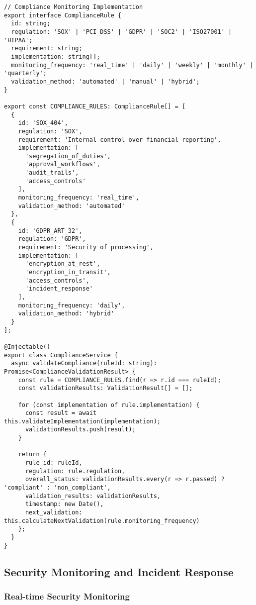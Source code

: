 \begin{verbatim}
// Compliance Monitoring Implementation
export interface ComplianceRule {
  id: string;
  regulation: 'SOX' | 'PCI_DSS' | 'GDPR' | 'SOC2' | 'ISO27001' | 'HIPAA';
  requirement: string;
  implementation: string[];
  monitoring_frequency: 'real_time' | 'daily' | 'weekly' | 'monthly' | 'quarterly';
  validation_method: 'automated' | 'manual' | 'hybrid';
}

export const COMPLIANCE_RULES: ComplianceRule[] = [
  {
    id: 'SOX_404',
    regulation: 'SOX',
    requirement: 'Internal control over financial reporting',
    implementation: [
      'segregation_of_duties',
      'approval_workflows',
      'audit_trails',
      'access_controls'
    ],
    monitoring_frequency: 'real_time',
    validation_method: 'automated'
  },
  {
    id: 'GDPR_ART_32',
    regulation: 'GDPR',
    requirement: 'Security of processing',
    implementation: [
      'encryption_at_rest',
      'encryption_in_transit',
      'access_controls',
      'incident_response'
    ],
    monitoring_frequency: 'daily',
    validation_method: 'hybrid'
  }
];

@Injectable()
export class ComplianceService {
  async validateCompliance(ruleId: string): Promise<ComplianceValidationResult> {
    const rule = COMPLIANCE_RULES.find(r => r.id === ruleId);
    const validationResults: ValidationResult[] = [];
    
    for (const implementation of rule.implementation) {
      const result = await this.validateImplementation(implementation);
      validationResults.push(result);
    }
    
    return {
      rule_id: ruleId,
      regulation: rule.regulation,
      overall_status: validationResults.every(r => r.passed) ? 'compliant' : 'non_compliant',
      validation_results: validationResults,
      timestamp: new Date(),
      next_validation: this.calculateNextValidation(rule.monitoring_frequency)
    };
  }
}
\end{verbatim}

\subsection{Security Monitoring and Incident Response}

\subsubsection{Real-time Security Monitoring}

